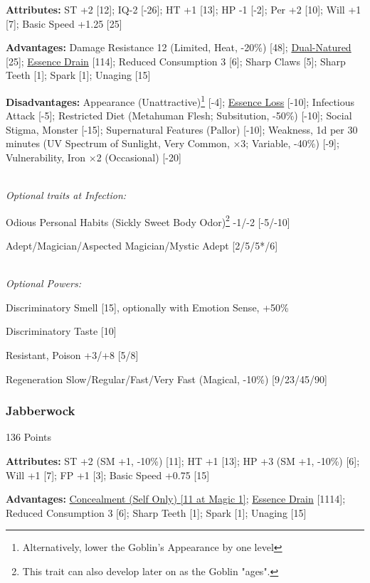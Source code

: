\begin{multicols*}{3}
	\textbf{Attributes:}
	ST +2 [12]; IQ-2 [-26]; HT +1 [13]; HP -1 [-2]; Per +2 [10]; Will +1 [7]; Basic Speed +1.25 [25]
	
	\textbf{Advantages:}
	Damage Resistance 12 (Limited, Heat, -20\%) [48]; \hyperref[dual_natured]{Dual-Natured} [25]; \hyperref[essence_drain]{Essence Drain} [114]; Reduced Consumption 3 [6]; Sharp Claws [5]; Sharp Teeth [1]; Spark [1]; Unaging [15]
	
	\textbf{Disadvantages:}	
	Appearance (Unattractive)\footnote{Alternatively, lower the Goblin's Appearance by one level} [-4]; \hyperref[essence_loss]{Essence Loss} [-10]; Infectious Attack [-5]; Restricted Diet (Metahuman Flesh; Subsitution, -50\%) [-10]; Social Stigma, Monster [-15]; Supernatural Features (Pallor) [-10]; Weakness, 1d per 30 minutes (UV Spectrum of Sunlight, Very Common, $\times$3; Variable, -40\%) [-9]; Vulnerability, Iron  $\times$2 (Occasional) [-20]
		
		
	\textit{\\Optional traits at Infection:}
	
	Odious Personal Habits (Sickly Sweet Body Odor)\footnote{This trait can also develop later on as the Goblin "ages".} -1/-2 [-5/-10]
	
	Adept/Magician/Aspected Magician/Mystic Adept [2/5/5*/6]
			
	\textit{\\Optional Powers:}
		
	Discriminatory Smell [15], optionally with Emotion Sense, +50\%
	
	Discriminatory Taste [10]
		
	Resistant, Poison +3/+8 [5/8]
	
	Regeneration Slow/Regular/Fast/Very Fast (Magical, -10\%) [9/23/45/90]
		
	\subsubsection{Jabberwock}\label{jabberwock}
	\begin{flushright}
		136 Points
	\end{flushright}
	
	\textbf{Attributes:}
	ST +2 (SM +1, -10\%) [11]; HT +1 [13]; HP +3 (SM +1, -10\%) [6]; Will +1 [7]; FP +1 [3]; Basic Speed +0.75 [15]
	
	\textbf{Advantages:}
	\hyperref[concealment_self_only]{Concealment (Self Only) [11 at Magic 1]}; \hyperref[essence_drain]{Essence Drain} [1114]; Reduced Consumption 3 [6]; Sharp Teeth [1]; Spark [1]; Unaging [15]
	

\end{multicols*}

